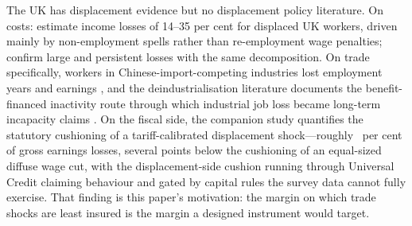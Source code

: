 The UK has displacement evidence but no displacement policy literature.
On costs: \citet{hijzen2010} estimate income losses of 14--35 per cent
for displaced UK workers, driven mainly by non-employment spells rather
than re-employment wage penalties; \citet{upwardwright2019} confirm large
and persistent losses with the same decomposition. On trade specifically,
workers in Chinese-import-competing industries lost employment years and
earnings \citep{delyonpessoa2021}, and the deindustrialisation literature
documents the benefit-financed inactivity route through which industrial
job loss became long-term incapacity claims
\citep{beatty2007, beatty2017}. On the fiscal side, the companion study
\citep{ahmadi2026} quantifies the statutory cushioning of a
tariff-calibrated displacement shock---roughly
\TaaCompanionDisplacedCushion\ per cent of gross earnings losses, several
points below the cushioning of an equal-sized diffuse wage cut, with the
displacement-side cushion running through Universal Credit claiming
behaviour and gated by capital rules the survey data cannot fully
exercise. That finding is this paper's motivation: the margin on which
trade shocks are least insured is the margin a designed instrument would
target.

